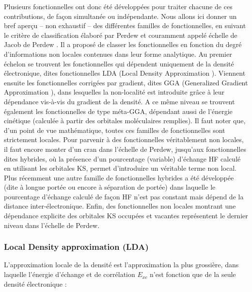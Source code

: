 \documentclass[12pt,a4paper]{book}
\begin{document}
	Plusieurs fonctionnelles ont donc été développées pour traiter chacune de ces contributions, de façon simultanée ou indépendante. Nous allons ici donner un bref aperçu -- non exhaustif -- des différentes familles de fonctionnelles, en suivant le critère de classification élaboré par Perdew et couramment appelé \og échelle de Jacob de Perdew \fg{}. Il a proposé de classer les fonctionnelles en fonction du degré d’informations non locales contenues dans leur forme analytique. Au premier échelon se trouvent les fonctionnelles qui dépendent uniquement de la densité électronique, dites fonctionnelles LDA (\og Local Density Approximation \fg{}). Viennent ensuite les fonctionnelles corrigées par gradient, dites GGA (\og Generalized Gradient Approximation \fg{}), dans lesquelles la non-localité est introduite grâce à leur dépendance vis-à-vis du gradient de la densité. A ce même niveau se trouvent également les fonctionnelles de type méta-GGA, dépendant aussi de l’énergie cinétique (calculée à partir des orbitales moléculaires remplies). Il faut noter que, d’un point de vue mathématique, toutes ces familles de fonctionnelles sont strictement locales. Pour parvenir à des fonctionnelles véritablement non locales, il faut encore monter d’un cran dans l’échelle de Perdew, jusqu’aux fonctionnelles dites hybrides, où la présence d’un pourcentage (variable) d’échange HF calculé en utilisant les orbitales KS, permet d’introduire un véritable terme non local. Plus récemment une autre famille de fonctionnelles hybrides a été développée (dite à longue portée ou encore à séparation de portée) dans laquelle le pourcentage d’échange calculé de façon HF n’est pas constant mais dépend de la distance inter-électronique. Enfin, des fonctionnelles non locales montrant une dépendance explicite des orbitales KS occupées et vacantes représentent le dernier niveau dans l’échelle de Perdew.
	
	\subsubsection{Local Density approximation (LDA)}\label{lda}
	
	L’approximation locale de la densité est l’approximation la plus grossière, dans laquelle l’énergie d’échange et de corrélation $E_{xc}$ n’est fonction que de la seule densité électronique :
	
\end{document}

